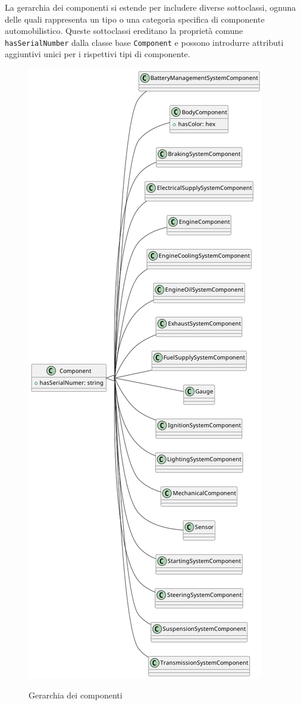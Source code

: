 La gerarchia dei componenti si estende per includere diverse sottoclassi, ognuna delle quali rappresenta un tipo o una categoria specifica di componente automobilistico. Queste sottoclassi ereditano la proprietà comune \texttt{hasSerialNumber} dalla classe base \texttt{Component} e possono introdurre attributi aggiuntivi unici per i rispettivi tipi di componente.

\begin{figure}[H]
    \caption{Gerarchia dei componenti}
    \includegraphics[height=\textheight]{figures/carpedia-component.png}
    \label{fig:carpedia-component}
\end{figure}

